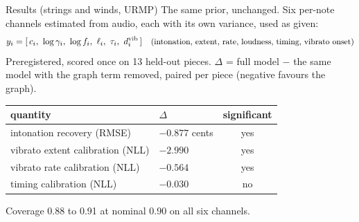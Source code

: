 \documentclass[aspectratio=169,11pt]{beamer}
\begin{document}




\begin{frame}{Results (strings and winds, URMP)}
  The same prior, unchanged. Six per-note channels estimated from audio,
  each with its own variance, used as given:
  \begin{equation*}
    y_i = [\, c_i,\ \log\gamma_i,\ \log f_i,\ \ell_i,\ \tau_i,\ d_i^{\mathrm{vib}} \,]
    \quad
    \text{\small (intonation, extent, rate, loudness, timing, vibrato onset)}
  \end{equation*}
  Preregistered, scored once on 13 held-out pieces. $\Delta$ = full
  model $-$ the same model with the graph term removed, paired per
  piece (negative favours the graph).
  \begin{center}
  \small
  \begin{tabular}{@{}llc@{}}
    \toprule
    quantity & $\Delta$ & significant \\
    \midrule
    intonation recovery (RMSE) & $-0.877$ cents & yes \\
    vibrato extent calibration (NLL) & $-2.990$ & yes \\
    vibrato rate calibration (NLL) & $-0.564$ & yes \\
    timing calibration (NLL) & $-0.030$ & no \\
    \bottomrule
  \end{tabular}
  \end{center}
  Coverage 0.88 to 0.91 at nominal 0.90 on all six channels.
  \vfill
\end{frame}

















\end{document}
